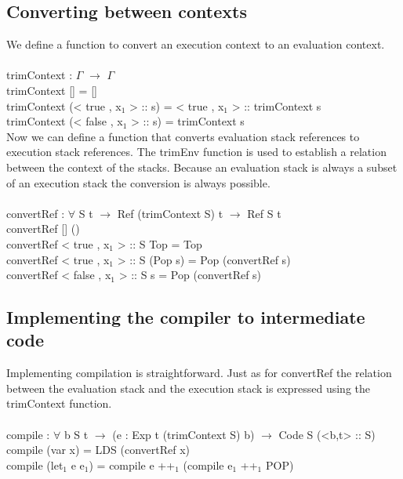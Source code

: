 \documentclass[paper=a4, fontsize=11pt]{scrartcl} %
\numberwithin{equation}{section} %
\numberwithin{figure}{section} %
\numberwithin{table}{section} %
\begin{document}
\subsection{Converting between contexts}

We define a function to convert an execution context to an evaluation context.\\
\ttfamily
\\
trimContext : $\Gamma$ $\rightarrow$ $\Gamma$\\
trimContext [] = []\\
trimContext (< true , x$_1$ > :: s) = < true , x$_1$ > :: trimContext s\\
trimContext (< false , x$_1$ > :: s) = trimContext s\\

\normalfont
Now we can define a function that converts evaluation stack references to execution stack references. The trimEnv function is used to establish a relation between the context of the stacks. Because an evaluation stack is always a subset of an execution stack the conversion is always possible.\\
\ttfamily
\\
convertRef : $\forall$ {S t} $\rightarrow$ Ref (trimContext S) t $\rightarrow$ Ref S t\\
convertRef {[]} ()\\
convertRef {< true , x$_1$ > :: S} Top = Top\\
convertRef {< true , x$_1$ > :: S} (Pop s) = Pop (convertRef s)\\
convertRef {< false , x$_1$ > :: S} s = Pop (convertRef s)\\

\normalfont

\subsection{Implementing the compiler to intermediate code}
Implementing compilation is straightforward. Just as for convertRef the relation between the evaluation stack and the execution stack is expressed using the trimContext function. \\
\\
\ttfamily
compile : $\forall$ {b S t} $\rightarrow$ (e : Exp t (trimContext S) b) $\rightarrow$ Code S (<b,t> :: S)\\
compile (var x) = LDS (convertRef x)\\
compile (let$_1$ e e$_1$) = compile e ++$_1$ (compile e$_1$ ++$_1$ POP)\\
\normalfont
\end{document}
